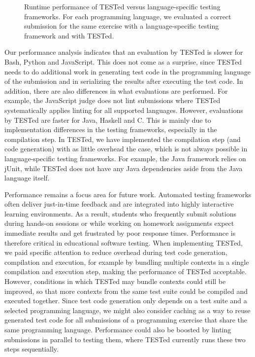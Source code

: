\documentclass[../main]{subfiles}
\begin{document}
\begin{figure}
    \centering
    
    \caption{Runtime performance of TESTed versus language-specific testing frameworks. For each programming language, we evaluated a correct submission for the same exercise with a language-specific testing framework and with TESTed.}
    \label{fig:performance}
\end{figure}

Our performance analysis indicates that an evaluation by TESTed is slower for Bash, Python and JavaScript.
This does not come as a surprise, since TESTed needs to do additional work in generating test code in the programming language of the submission and in serializing the results after executing the test code.
In addition, there are also differences in what evaluations are performed.
For example, the JavaScript judge does not lint submissions where TESTed systematically applies linting for all supported languages.
However, evaluations by TESTed are faster for Java, Haskell and C\@.
This is mainly due to implementation differences in the testing frameworks, especially in the compilation step.
In TESTed, we have implemented the compilation step (and code generation) with as little overhead the case, which is not always possible in language-specific testing frameworks.
For example, the Java framework relies on jUnit, while TESTed does not have any Java dependencies aside from the Java language itself.

Performance remains a focus area for future work.
Automated testing frameworks often deliver just-in-time feedback and are integrated into highly interactive learning environments.
As a result, students who frequently submit solutions during hands-on sessions or while working on homework assignments expect immediate results and get frustrated by poor response times.
Performance is therefore critical in educational software testing.
When implementing TESTed, we paid specific attention to reduce overhead during test code generation, compilation and execution, for example by bundling multiple contexts in a single compilation and execution step, making the performance of TESTed acceptable.
However, conditions in which TESTed may bundle contexts could still be improved, so that more contexts from the same test suite could be compiled and executed together.
Since test code generation only depends on a test suite and a selected programming language, we might also consider caching as a way to reuse generated test code for all submissions of a programming exercise that share the same programming language.
Performance could also be boosted by linting submissions in parallel to testing them, where TESTed currently runs these two steps sequentially.
\end{document}
